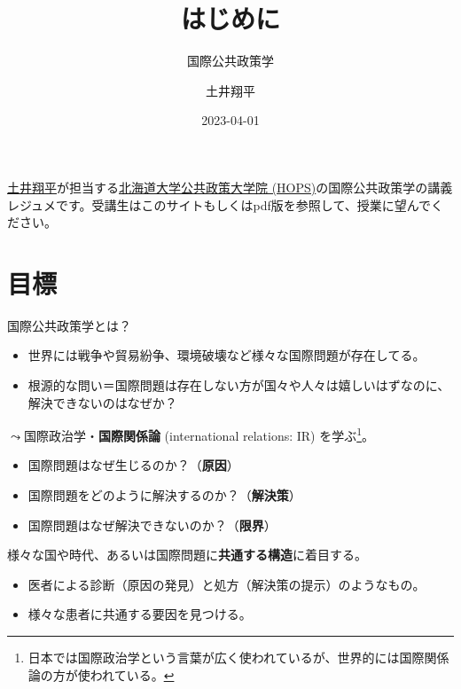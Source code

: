 \documentclass[
  xelatex,
  ja=standard]{bxjsarticle}
\title{はじめに}
\subtitle{国際公共政策学}
\author{土井翔平}
\date{2023-04-01}
\providecommand{\tightlist}{%
  \setlength{\itemsep}{0pt}\setlength{\parskip}{0pt}}\usepackage{longtable,booktabs,array}
\begin{document}
\maketitle
\ifdefined\Shaded\renewenvironment{Shaded}{\begin{tcolorbox}[breakable, sharp corners, interior hidden, borderline west={3pt}{0pt}{shadecolor}, enhanced, boxrule=0pt, frame hidden]}{\end{tcolorbox}}\fi

\href{https://shohei-doi.github.io}{土井翔平}が担当する\href{https://www.hops.hokudai.ac.jp/}{北海道大学公共政策大学院
(HOPS)}の国際公共政策学の講義レジュメです。受講生はこのサイトもしくはpdf版を参照して、授業に望んでください。

\hypertarget{ux76eeux6a19}{%
\section{目標}\label{ux76eeux6a19}}

国際公共政策学とは？

\begin{itemize}
\tightlist
\item
  世界には戦争や貿易紛争、環境破壊など様々な国際問題が存在してる。
\item
  根源的な問い＝国際問題は存在しない方が国々や人々は嬉しいはずなのに、解決できないのはなぜか？
\end{itemize}

\(\leadsto\)国際政治学・\textbf{国際関係論} (international relations:
IR) を学ぶ\footnote{日本では国際政治学という言葉が広く使われているが、世界的には国際関係論の方が使われている。}。

\begin{itemize}
\tightlist
\item
  国際問題はなぜ生じるのか？（\textbf{原因}）
\item
  国際問題をどのように解決するのか？（\textbf{解決策}）
\item
  国際問題はなぜ解決できないのか？（\textbf{限界}）
\end{itemize}

様々な国や時代、あるいは国際問題に\textbf{共通する構造}に着目する。

\begin{itemize}
\tightlist
\item
  医者による診断（原因の発見）と処方（解決策の提示）のようなもの。
\item
  様々な患者に共通する要因を見つける。
\end{itemize}
\end{document}
